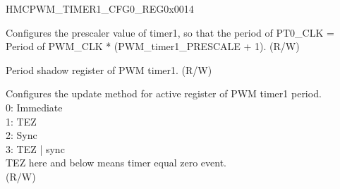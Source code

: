 \begin{register}{H}{MCPWM\_TIMER1\_CFG0\_REG}{0x0014}\label{regdesc:MCPWMTIMER1CFG0REG}
%
%
%
%
\regnewline%
\begin{regdesc}\begin{reglist}
\label{fielddesc:MCPWMTIMER1PRESCALE}\item [MCPWM\_TIMER1\_PRESCALE] Configures the prescaler value of timer1, so that the period of PT0\_CLK = Period of PWM\_CLK * (PWM\_timer1\_PRESCALE + 1). (R/W)
\label{fielddesc:MCPWMTIMER1PERIOD}\item [MCPWM\_TIMER1\_PERIOD] Period shadow register of PWM timer1. (R/W)
\label{fielddesc:MCPWMTIMER1PERIODUPMETHOD}\item [MCPWM\_TIMER1\_PERIOD\_UPMETHOD] Configures the update method for active register of PWM timer1 period. 
\\0: Immediate
\\1: TEZ
\\2: Sync
\\3: TEZ | sync
\\TEZ here and below means timer equal zero event.
\\(R/W)
\end{reglist}\end{regdesc}
\end{register}


